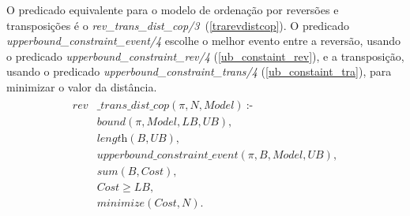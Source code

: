 O predicado equivalente para o modelo de ordenação por reversões e
transposições é
o \textit{rev\_trans\_dist\_cop/3}~(\ref{trarevdistcop}). O
predicado \textit{upperbound\_constraint\_event/4} escolhe o melhor
evento entre a reversão, usando o
predicado \textit{upperbound\_constraint\_rev/4}
(\ref{ub_constaint_rev}), e a transposição, usando o
predicado \textit{upperbound\_constraint\_trans/4}
(\ref{ub_constaint_tra}), para minimizar o valor da distância.
\begin{align}
  \label{trarevdistcop}
  \begin{split}
  \textit{rev}&\textit{\_trans\_dist\_cop}(\pi, N, Model)~\text{:-} \\
  &\textit{bound}(\pi, Model, LB, UB), \\
  &\textit{length}(B, UB),  \\
  &\textit{upperbound\_constraint\_event}(\pi, B, Model, UB), \\
  &\textit{sum}(B, Cost),  \\
  &\textit{Cost} \ge \textit{LB},  \\
  &\textit{minimize}(Cost, N). 
  \end{split}
\end{align}

